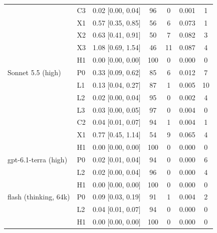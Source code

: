 \begin{tabular}{@{}llccccc@{}}
 & C3 & 0.02 [0.00, 0.04] & 96 & 0 & 0.001 & 1 \\
 & X1 & 0.57 [0.35, 0.85] & 56 & 6 & 0.073 & 1 \\
 & X2 & 0.63 [0.41, 0.91] & 50 & 7 & 0.082 & 3 \\
 & X3 & 1.08 [0.69, 1.54] & 46 & 11 & 0.087 & 4 \\
 & H1 & 0.00 [0.00, 0.00] & 100 & 0 & 0.000 & 0 \\
\midrule
Sonnet 5.5 (high) & P0 & 0.33 [0.09, 0.62] & 85 & 6 & 0.012 & 7 \\
 & L1 & 0.13 [0.04, 0.27] & 87 & 1 & 0.005 & 10 \\
 & L2 & 0.02 [0.00, 0.04] & 95 & 0 & 0.002 & 4 \\
 & L3 & 0.03 [0.00, 0.05] & 97 & 0 & 0.004 & 0 \\
 & C2 & 0.04 [0.01, 0.07] & 94 & 1 & 0.004 & 1 \\
 & X1 & 0.77 [0.45, 1.14] & 54 & 9 & 0.065 & 4 \\
 & H1 & 0.00 [0.00, 0.00] & 100 & 0 & 0.000 & 0 \\
\midrule
gpt-6.1-terra (high) & P0 & 0.02 [0.01, 0.04] & 94 & 0 & 0.000 & 6 \\
 & L2 & 0.02 [0.00, 0.04] & 96 & 0 & 0.000 & 4 \\
 & H1 & 0.00 [0.00, 0.00] & 100 & 0 & 0.000 & 0 \\
\midrule
flash (thinking, 64k) & P0 & 0.09 [0.03, 0.19] & 91 & 1 & 0.004 & 2 \\
 & L2 & 0.04 [0.01, 0.07] & 94 & 0 & 0.000 & 0 \\
 & H1 & 0.00 [0.00, 0.00] & 100 & 0 & 0.000 & 0 \\
\bottomrule
\end{tabular}
